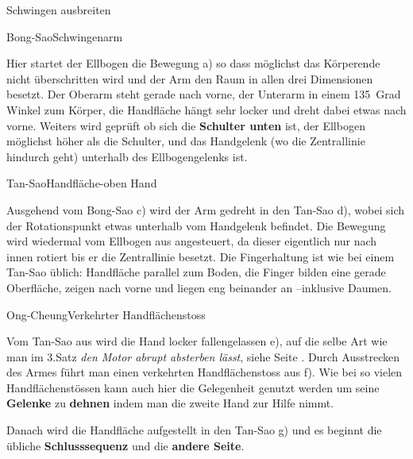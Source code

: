 \begin{WTSatz}{Schwingen ausbreiten}%

	
	\begin{WTSatzTeil}{Bong-Sao}{Schwingenarm}
		
		Hier startet der Ellbogen die Bewegung a) so dass m\"oglichst das K\"orperende nicht \"uberschritten wird und der Arm den Raum in allen drei Dimensionen besetzt. Der Oberarm steht gerade nach vorne, der Unterarm in einem 135~Grad Winkel zum K\"orper, die Handfl\"ache h\"angt sehr locker und dreht dabei etwas nach vorne. Weiters wird gepr\"uft ob sich die \textbf{Schulter unten} ist, der Ellbogen m\"oglichst h\"oher als die Schulter, und das Handgelenk (wo die Zentrallinie hindurch geht) unterhalb des Ellbogengelenks ist.
		
		
	\end{WTSatzTeil}
	\begin{WTSatzTeil}{Tan-Sao}{Handfl\"ache-oben Hand}
		
		Ausgehend vom Bong-Sao c) wird der Arm gedreht in den Tan-Sao d), wobei sich der Rotationspunkt etwas unterhalb vom Handgelenk befindet. Die Bewegung wird wiedermal vom Ellbogen aus angesteuert, da dieser eigentlich nur nach innen rotiert bis er die Zentrallinie besetzt.
		Die Fingerhaltung ist wie bei einem Tan-Sao \"ublich: Handfl\"ache parallel zum Boden, die Finger bilden eine gerade Oberfl\"ache, zeigen nach vorne und liegen eng beinander an --inklusive Daumen.
		
	\end{WTSatzTeil}
	\begin{WTSatzTeil}{Ong-Cheung}{Verkehrter Handfl\"achenstoss}
		
		Vom Tan-Sao aus wird die Hand locker fallengelassen e), auf die selbe Art wie man im 3.Satz \textit{den Motor abrupt absterben l\"asst}, siehe Seite \pageref{LBL_motorabsterben}. Durch Ausstrecken des Armes f\"uhrt man einen verkehrten Handfl\"achenstoss aus f). Wie bei so vielen Handfl\"achenst\"ossen kann auch hier die Gelegenheit genutzt werden um seine \textbf{Gelenke} zu \textbf{dehnen} indem man die zweite Hand zur Hilfe nimmt.
		
		Danach wird die Handfl\"ache aufgestellt in den Tan-Sao g) und es beginnt die \"ubliche \textbf{Schlusssequenz} und die \textbf{andere Seite}.
		
	\end{WTSatzTeil}
\end{WTSatz}



